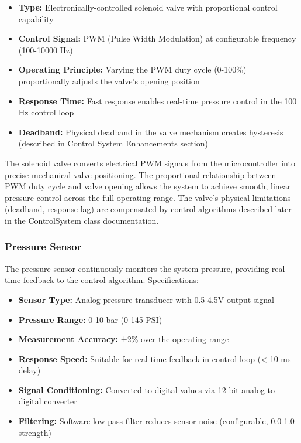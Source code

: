 \documentclass[12pt,a4paper]{article}
\begin{document}
    \begin{itemize}
        \item \textbf{Type:} Electronically-controlled solenoid valve with proportional control capability
        \item \textbf{Control Signal:} PWM (Pulse Width Modulation) at configurable frequency (100-10000 Hz)
        \item \textbf{Operating Principle:} Varying the PWM duty cycle (0-100\%) proportionally adjusts the valve's opening position
        \item \textbf{Response Time:} Fast response enables real-time pressure control in the 100 Hz control loop
        \item \textbf{Deadband:} Physical deadband in the valve mechanism creates hysteresis (described in Control System Enhancements section)
    \end{itemize}

The solenoid valve converts electrical PWM signals from the microcontroller into precise mechanical valve positioning. The proportional relationship between PWM duty cycle and valve opening allows the system to achieve smooth, linear pressure control across the full operating range. The valve's physical limitations (deadband, response lag) are compensated by control algorithms described later in the ControlSystem class documentation.

\subsubsection{Pressure Sensor}

The pressure sensor continuously monitors the system pressure, providing real-time feedback to the control algorithm. Specifications:

    \begin{itemize}
        \item \textbf{Sensor Type:} Analog pressure transducer with 0.5-4.5V output signal
        \item \textbf{Pressure Range:} 0-10 bar (0-145 PSI)
        \item \textbf{Measurement Accuracy:} ±2\% over the operating range
        \item \textbf{Response Speed:} Suitable for real-time feedback in control loop (< 10 ms delay)
        \item \textbf{Signal Conditioning:} Converted to digital values via 12-bit analog-to-digital converter
        \item \textbf{Filtering:} Software low-pass filter reduces sensor noise (configurable, 0.0-1.0 strength)
    \end{itemize}
\end{document}
